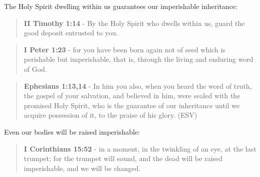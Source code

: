 \documentclass[11pt]{article}
\begin{document}
The Holy Spirit dwelling within us guarantees our imperishable inheritance:

\begin{quote}
\textbf{II Timothy 1:14} - By the Holy Spirit who dwells within us, guard the good deposit entrusted to you.
\end{quote}

\begin{quote}
\textbf{I Peter 1:23} - for you have been born again not of seed which is perishable but imperishable, that is, through the living and enduring word of God.
\end{quote}

\begin{quote}
\textbf{Ephesians 1:13,14} -  In him you also, when you heard the word of truth, the gospel of your salvation, and believed in him, were sealed with the promised Holy Spirit, who is the guarantee of our inheritance until we acquire possession of it, to the praise of his glory.  (ESV)
\end{quote}

Even our bodies will be raised imperishable:

\begin{quote}
\textbf{I Corinthians 15:52} - in a moment, in the twinkling of an eye, at the last trumpet; for the trumpet will sound, and the dead will be raised imperishable, and we will be changed.
\end{quote}
\end{document}
